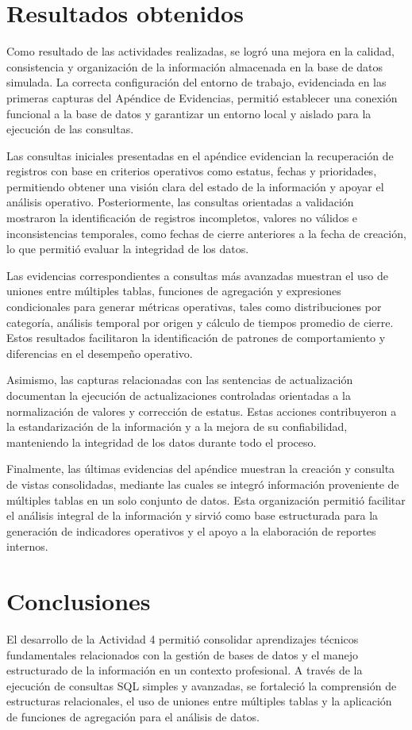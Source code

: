 \documentclass[12pt]{article}
\begin{document}
\section*{Resultados obtenidos}
Como resultado de las actividades realizadas, se logró una mejora en la calidad, consistencia y organización de la información almacenada en la base de datos simulada. La correcta configuración del entorno de trabajo, evidenciada en las primeras capturas del Apéndice de Evidencias, permitió establecer una conexión funcional a la base de datos y garantizar un entorno local y aislado para la ejecución de las consultas.

Las consultas iniciales presentadas en el apéndice evidencian la recuperación de registros con base en criterios operativos como estatus, fechas y prioridades, permitiendo obtener una visión clara del estado de la información y apoyar el análisis operativo. Posteriormente, las consultas orientadas a validación mostraron la identificación de registros incompletos, valores no válidos e inconsistencias temporales, como fechas de cierre anteriores a la fecha de creación, lo que permitió evaluar la integridad de los datos.

Las evidencias correspondientes a consultas más avanzadas muestran el uso de uniones entre múltiples tablas, funciones de agregación y expresiones condicionales para generar métricas operativas, tales como distribuciones por categoría, análisis temporal por origen y cálculo de tiempos promedio de cierre. Estos resultados facilitaron la identificación de patrones de comportamiento y diferencias en el desempeño operativo.

Asimismo, las capturas relacionadas con las sentencias de actualización documentan la ejecución de actualizaciones controladas orientadas a la normalización de valores y corrección de estatus. Estas acciones contribuyeron a la estandarización de la información y a la mejora de su confiabilidad, manteniendo la integridad de los datos durante todo el proceso.

Finalmente, las últimas evidencias del apéndice muestran la creación y consulta de vistas consolidadas, mediante las cuales se integró información proveniente de múltiples tablas en un solo conjunto de datos. Esta organización permitió facilitar el análisis integral de la información y sirvió como base estructurada para la generación de indicadores operativos y el apoyo a la elaboración de reportes internos.


\section*{Conclusiones}
El desarrollo de la Actividad 4 permitió consolidar aprendizajes técnicos fundamentales relacionados con la gestión de bases de datos y el manejo estructurado de la información en un contexto profesional. A través de la ejecución de consultas SQL simples y avanzadas, se fortaleció la comprensión de estructuras relacionales, el uso de uniones entre múltiples tablas y la aplicación de funciones de agregación para el análisis de datos.
\end{document}
